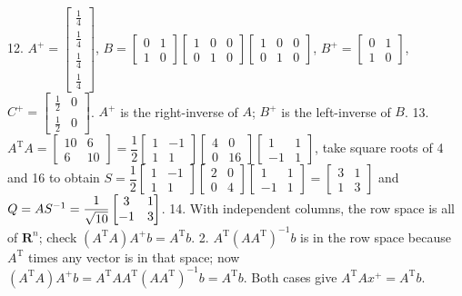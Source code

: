 12. \(A^{+}=\begin{bmatrix}\frac{1}{4}\\ \frac{1}{4}\\ \frac{1}{4}\\ \frac{1}{4}\end{bmatrix}\), \(B=\begin{bmatrix}0&1\\ 1&0\end{bmatrix}\begin{bmatrix}1&0&0\\ 0&1&0\end{bmatrix}\begin{bmatrix}1&0&0\\ 0&1&0\end{bmatrix}\), \(B^{+}=\begin{bmatrix}0&1\\ 1&0\end{bmatrix}\), \(C^{+}=\begin{bmatrix}\frac{1}{2}&0\\ \frac{1}{2}&0\end{bmatrix}\). \(A^{+}\) is the right-inverse of \(A\); \(B^{+}\) is the left-inverse of \(B\).
13. \(A^{\mathrm{T}}A=\begin{bmatrix}10&6\\ 6&10\end{bmatrix}=\dfrac{1}{2}\begin{bmatrix}1&-1\\ 1&1\end{bmatrix}\begin{bmatrix}4&0\\ 0&16\end{bmatrix}\begin{bmatrix}1&1\\ -1&1\end{bmatrix}\), take square roots of 4 and 16 to obtain \(S=\dfrac{1}{2}\begin{bmatrix}1&-1\\ 1&1\end{bmatrix}\begin{bmatrix}2&0\\ 0&4\end{bmatrix}\begin{bmatrix}1&1\\ -1&1\end{bmatrix}=\begin{bmatrix}3&1\\ 1&3\end{bmatrix}\) and \(Q=AS^{-1}=\\ \dfrac{1}{\sqrt{10}}\begin{bmatrix}3&1\\ -1&3\end{bmatrix}\).
14. With independent columns, the row space is all of \(\mathbf{R}^{n}\); check \((A^{\mathrm{T}}A)A^{+}b=A^{\mathrm{T}}b\). 2. \(A^{\mathrm{T}}(AA^{\mathrm{T}})^{-1}b\) is in the row space because \(A^{\mathrm{T}}\) times any vector is in that space; now \((A^{\mathrm{T}}A)A^{+}b=A^{\mathrm{T}}AA^{\mathrm{T}}(AA^{\mathrm{T}})^{-1}b=A^ {\mathrm{T}}b\). Both cases give \(A^{\mathrm{T}}Ax^{+}=A^{\mathrm{T}}b\).

